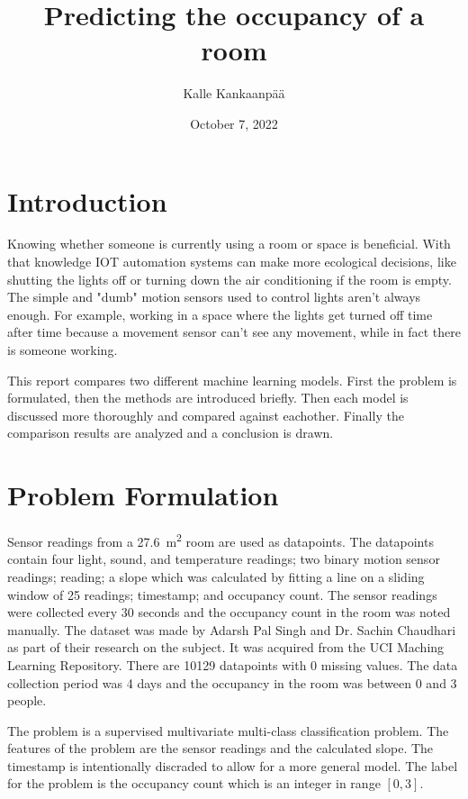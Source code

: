 \documentclass[11pt]{article}
\title{Predicting the occupancy of a room}
\author{Kalle Kankaanpää}
\date{October 7, 2022}
\begin{document}
\maketitle
\section{Introduction}

Knowing whether someone is currently using a room or space is beneficial.
With that knowledge IOT automation systems can make more ecological decisions, like shutting the lights off or turning down the air conditioning if the room is empty.
The simple and "dumb" motion sensors used to control lights aren't always enough.
For example, working in a space where the lights get turned off time after time because a movement sensor can't see any movement, while in fact there is someone working.

This report compares two different machine learning models.
First the problem is formulated, then the methods are introduced briefly.
Then each model is discussed more thoroughly and compared against eachother.
Finally the comparison results are analyzed and a conclusion is drawn.

\section{Problem Formulation}

Sensor readings from a \SI{27,6}{\meter\squared} room are used as datapoints. 
The datapoints contain four light, sound, and temperature readings; two binary motion sensor readings;  reading; a  slope which was calculated by fitting a line on a sliding window of 25  readings; timestamp; and occupancy count.
The sensor readings were collected every 30 seconds and the occupancy count in the room was noted manually.
The dataset was made by Adarsh Pal Singh and Dr. Sachin Chaudhari as part of their research on the subject\cite{Singh2018}.
It was acquired from the UCI Maching Learning Repository\cite{Singh2021}.
There are 10129 datapoints with 0 missing values.
The data collection period was 4 days and the occupancy in the room was between 0 and 3 people.

The problem is a supervised multivariate multi-class classification problem. 
The features of the problem are the sensor readings and the calculated  slope.
The timestamp is intentionally discraded to allow for a more general model.
The label for the problem is the occupancy count which is an integer in range $[0, 3]$.
\end{document}
